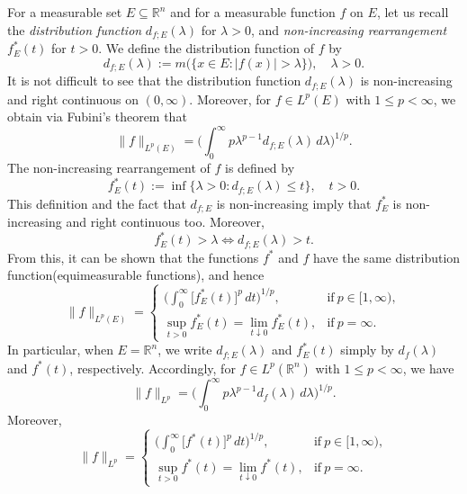 \documentclass{birkjour}
\theoremstyle{definition}
\theoremstyle{remark}
\numberwithin{equation}{section}
\begin{document}
For a measurable set $E\subseteq\mathbb R^n$ and for a measurable function $f$ on $E$, let us recall the \emph{distribution function} $d_{f;E}(\lambda)$ for $\lambda>0$, and \emph{non-increasing rearrangement} $f^{*}_{E}(t)$ for $t>0$. We define the distribution function of $f$ by
\begin{equation*}
d_{f;E}(\lambda):=m\big(\big\{x\in E:|f(x)|>\lambda\big\}\big),\quad \lambda>0.
\end{equation*}
It is not difficult to see that the distribution function $d_{f;E}(\lambda)$ is non-increasing and right continuous on $(0,\infty)$. Moreover, for $f\in L^p(E)$ with $1\leq p<\infty$, we obtain via Fubini's theorem that
\begin{equation}\label{cake1}
\|f\|_{L^p(E)}=\bigg(\int_0^{\infty}p\lambda^{p-1}d_{f;E}(\lambda)\,d\lambda\bigg)^{1/p}.
\end{equation}
The non-increasing rearrangement of $f$ is defined by
\begin{equation*}
f^{*}_{E}(t):=\inf\big\{\lambda>0:d_{f;E}(\lambda)\leq t\big\},\quad t>0.
\end{equation*}
This definition and the fact that $d_{f;E}$ is non-increasing imply that $f^{*}_{E}$ is non-increasing and right continuous too. Moreover,
\begin{equation*}
f^{*}_{E}(t)>\lambda\Longleftrightarrow d_{f;E}(\lambda)>t.
\end{equation*}
From this, it can be shown that the functions $f^{*}$ and $f$ have the same distribution function(equimeasurable functions), and hence
\begin{equation}\label{equality1}
\|f\|_{L^p(E)}=
\begin{cases}
\displaystyle\bigg(\int_{0}^{\infty}\big[f^{*}_{E}(t)\big]^p\,dt\bigg)^{1/p}, &\mbox{if}~ p\in[1,\infty),\\
\displaystyle\sup_{t>0}f^{*}_{E}(t)=\lim_{t\downarrow 0}f^{*}_{E}(t), &\mbox{if}~ p=\infty.
\end{cases}
\end{equation}
In particular, when $E=\mathbb R^n$, we write $d_{f;E}(\lambda)$ and $f^{*}_{E}(t)$ simply by $d_{f}(\lambda)$ and $f^{*}(t)$, respectively. Accordingly, for $f\in L^p(\mathbb R^n)$ with $1\leq p<\infty$, we have
\begin{equation}\label{cake2}
\|f\|_{L^p}=\bigg(\int_0^{\infty}p\lambda^{p-1}d_{f}(\lambda)\,d\lambda\bigg)^{1/p}.
\end{equation}
Moreover,
\begin{equation}\label{equality2}
\|f\|_{L^p}=
\begin{cases}
\displaystyle\bigg(\int_{0}^{\infty}\big[f^{*}(t)\big]^p\,dt\bigg)^{1/p}, &\mbox{if}~ p\in[1,\infty),\\
\displaystyle\sup_{t>0}f^{*}(t)=\lim_{t\downarrow 0}f^{*}(t), &\mbox{if}~ p=\infty.
\end{cases}
\end{equation}
\end{document}

